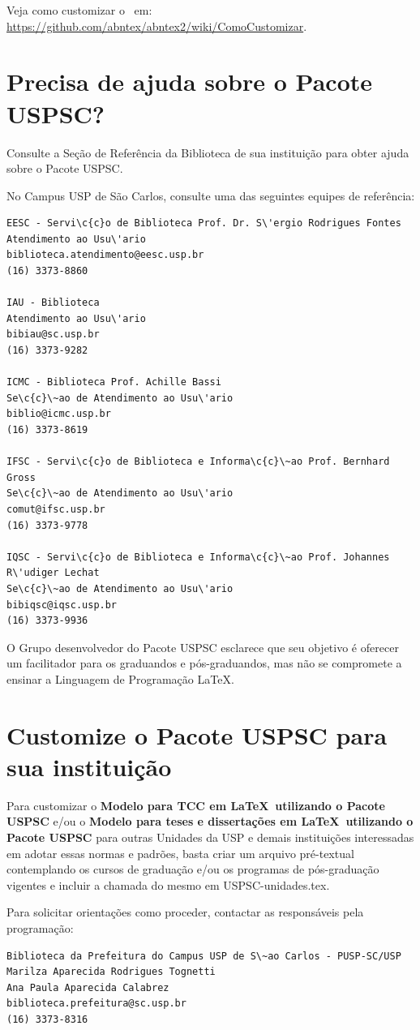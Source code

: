 Veja como customizar o \abnTeX\ em:
\url{https://github.com/abntex/abntex2/wiki/ComoCustomizar}.

\section{Precisa de ajuda sobre o Pacote USPSC?}
Consulte a Se\c{c}\~ao de Refer\^encia da Biblioteca de sua institui\c{c}\~ao para obter ajuda sobre o Pacote USPSC.

No Campus USP de S\~ao Carlos, consulte uma das seguintes equipes de refer\^encia:
\begin{verbatim}
EESC - Servi\c{c}o de Biblioteca Prof. Dr. S\'ergio Rodrigues Fontes 
Atendimento ao Usu\'ario
biblioteca.atendimento@eesc.usp.br
(16) 3373-8860

IAU - Biblioteca
Atendimento ao Usu\'ario
bibiau@sc.usp.br
(16) 3373-9282

ICMC - Biblioteca Prof. Achille Bassi
Se\c{c}\~ao de Atendimento ao Usu\'ario
biblio@icmc.usp.br
(16) 3373-8619

IFSC - Servi\c{c}o de Biblioteca e Informa\c{c}\~ao Prof. Bernhard Gross
Se\c{c}\~ao de Atendimento ao Usu\'ario
comut@ifsc.usp.br
(16) 3373-9778

IQSC - Servi\c{c}o de Biblioteca e Informa\c{c}\~ao Prof. Johannes R\'udiger Lechat
Se\c{c}\~ao de Atendimento ao Usu\'ario
bibiqsc@iqsc.usp.br
(16) 3373-9936
\end{verbatim}


O Grupo desenvolvedor do Pacote USPSC esclarece que seu objetivo \'e oferecer um facilitador para os graduandos e p\'os-graduandos, mas n\~ao se compromete a ensinar a Linguagem de Programa\c{c}\~ao \LaTeX .  

\section{Customize o Pacote USPSC para sua institui\c{c}\~ao}

Para customizar o \textbf{Modelo para TCC em \LaTeX\ utilizando o Pacote USPSC} e/ou o \textbf{Modelo para teses e disserta\c{c}\~oes em \LaTeX\ utilizando o Pacote USPSC} para outras Unidades da USP e demais institui\c{c}\~oes interessadas em adotar essas normas e padr\~oes, basta criar um arquivo pr\'e-textual contemplando os cursos de gradua\c{c}\~ao e/ou os programas de p\'os-gradua\c{c}\~ao vigentes e incluir a chamada do mesmo em USPSC-unidades.tex.

Para solicitar orienta\c{c}\~oes como proceder, contactar as respons\'aveis pela programa\c{c}\~ao:

\begin{verbatim}
Biblioteca da Prefeitura do Campus USP de S\~ao Carlos - PUSP-SC/USP
Marilza Aparecida Rodrigues Tognetti
Ana Paula Aparecida Calabrez
biblioteca.prefeitura@sc.usp.br
(16) 3373-8316
\end{verbatim}





